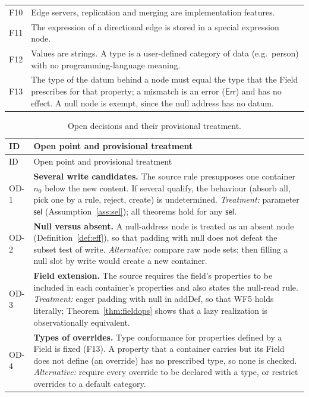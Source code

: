 \documentclass[11pt,a4paper]{article}
\theoremstyle{definition}
\theoremstyle{plain}
\theoremstyle{remark}
\newcommand{\Err}{\mathsf{Err}}
\newcommand{\sel}{\mathsf{sel}}
\begin{document}
\begin{longtable}{@{}l p{}@{}}
F10 & Edge servers, replication and merging are implementation features.\\
F11 & The expression of a directional edge is stored in a special expression node.\\
F12 & Values are strings. A type is a user-defined category of data (e.g.\ person) with no programming-language meaning.\\
F13 & The type of the datum behind a node must equal the type that the Field prescribes for that property; a mismatch is an error ($\Err$) and has no effect. A null node is exempt, since the null address has no datum.\\
\bottomrule
\end{longtable}

\begin{longtable}{@{}l p{}@{}}
\caption{Open decisions and their provisional treatment.}\label{tab:open}\\
\toprule ID & Open point and provisional treatment \\ \midrule \endfirsthead
\toprule ID & Open point and provisional treatment \\ \midrule \endhead
OD-1 & \textbf{Several write candidates.} The source rule presupposes one container $n_0$ below the new content. If several qualify, the behaviour (absorb all, pick one by a rule, reject, create) is undetermined. \emph{Treatment:} parameter $\sel$ (Assumption~\ref{ass:sel}); all theorems hold for any $\sel$.\\
OD-2 & \textbf{Null versus absent.} A null-address node is treated as an absent node (Definition~\ref{def:eff}), so that padding with null does not defeat the subset test of \textsf{write}. \emph{Alternative:} compare raw node sets; then filling a null slot by \textsf{write} would create a new container.\\
OD-3 & \textbf{Field extension.} The source requires the field's properties to be included in each container's properties and also states the null-read rule. \emph{Treatment:} eager padding with null in \textsf{addDef}, so that WF5 holds literally; Theorem~\ref{thm:fieldops} shows that a lazy realization is observationally equivalent.\\
OD-4 & \textbf{Types of overrides.} Type conformance for properties defined by a Field is fixed (F13). A property that a container carries but its Field does not define (an override) has no prescribed type, so none is checked. \emph{Alternative:} require every override to be declared with a type, or restrict overrides to a default category.\\

\end{longtable}
\end{document}
